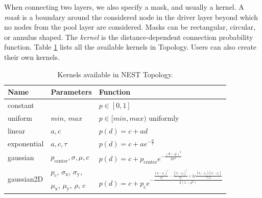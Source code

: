 When connecting two layers, we also specify a mask, and usually a kernel. A \emph{mask} is a boundary around the considered node in the driver layer beyond which no nodes from the pool layer are considered. Masks can be rectangular, circular, or annulus shaped. The \emph{kernel} is the distance-dependent connection probability function. Table \ref{tab:kernels} lists all the available kernels in Topology. Users can also create their own kernels.

\begin{table}
\begin{tabularx}{\textwidth}{| l | X | l |}
\hline
\bf{Name} & \bf{Parameters} & \bf{Function} \\ \hline
constant &  & $p \in [0, 1]$ \\ \hline
uniform & $min$, $max$ & $p \in [min, max)$ uniformly \\ \hline
linear & $a, c$ & $p(d) = c + ad$ \\ \hline
exponential & $a, c, \tau$ & $p(d) = c + ae^{-\frac{d}{\tau}}$ \\ \hline
gaussian & $p_{\text{center}}, \sigma, \mu, c$ & $p(d) = c + p_{\text{center}} e^{-\frac{(d-\mu)^2}{2\sigma^2}}$ \\ \hline
\multirow{2}{*}{gaussian2D} & $p_\text{c}$, $\sigma_\text{x}$, $\sigma_\text{y}$,  & \multirow{2}{*}{$p(d) = c + p_{\text{c}} e^{-\frac{    \frac{(d_\text{x}-\mu_\text{x})^2}{\sigma_\text{x}^2} - \frac{(d_\text{y}-\mu_\text{y})^2}{\sigma_\text{y}^2} + 2\rho \frac{(d_\text{x}-\mu_x)(d_\text{y}-\mu_\text{y})}{\sigma_\text{x} \sigma_\text{y}}}{2(1-\rho^2)}}$} \\ 
& $\mu_\text{x}$, $\mu_\text{y}$, $\rho$, $c$ & \\ \hline
\end{tabularx}
\caption[Kernels in NEST Topology]{Kernels available in NEST Topology.}
\label{tab:kernels}
\end{table}

